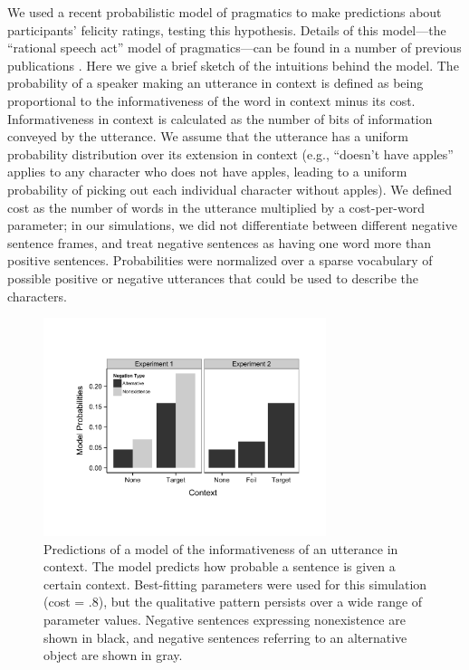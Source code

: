 \documentclass[10pt,letterpaper]{article}
\begin{document}
We used a recent probabilistic model of pragmatics to make predictions about participants' felicity ratings, testing this hypothesis. Details of this model---the ``rational speech act'' model of pragmatics---can be found in a number of previous publications \cite{frank2012,goodman2013,nordmeyer2014}. Here we give a brief sketch of the intuitions behind the model. The probability of a speaker making an utterance in context is defined as being  proportional to the informativeness of the word in context minus its cost.  Informativeness in context is calculated as the number of bits of information conveyed by the utterance.  We assume that the utterance has a uniform probability distribution over its extension in context (e.g., ``doesn't have apples'' applies to any character who does not have apples, leading to a uniform probability of picking out each individual character without apples). We defined cost as the number of words in the utterance multiplied by a cost-per-word parameter; in our simulations, we did not differentiate between different negative sentence frames, and treat negative sentences as having one word more than positive sentences.  Probabilities were normalized over a sparse vocabulary of possible positive or negative utterances that could be used to describe the characters.

\begin{figure}[t]
\begin{center} 
\includegraphics[width=3.25in]{figures/model_predictions.pdf}
\caption{\label{fig:model} Predictions of a model of the informativeness of an utterance in context.  The model predicts how probable a sentence is given a certain context.  Best-fitting parameters were used for this simulation (cost = .8), but the qualitative pattern persists over a wide range of parameter values.  Negative sentences expressing nonexistence are shown in black, and negative sentences referring to an alternative object are shown in gray.}
\end{center} 
\end{figure}
\end{document}
